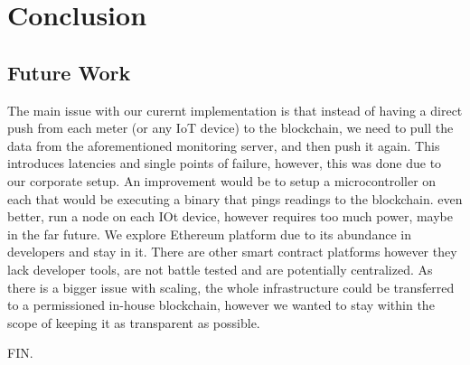 \chapter{Conclusion}\label{ch:conclusion}

\section{Future Work}
The main issue with our curernt implementation is that instead of having a direct push from each meter (or any IoT device) to the blockchain, we need to pull the data from the aforementioned monitoring server, and then push it again. This introduces latencies and single points of failure, however, this was done due to our corporate setup. An improvement would be to setup a microcontroller on each that would be executing a binary that pings readings to the blockchain. even better, run a node on each IOt device, however requires too much power, maybe in the far future. We explore Ethereum platform due to its abundance in developers and stay in it. There are other smart contract platforms however they lack developer tools, are not battle tested and are potentially centralized. As there is a bigger issue with scaling, the whole infrastructure could be transferred to a permissioned in-house blockchain, however we wanted to stay within the scope of keeping it as transparent as possible.

FIN.